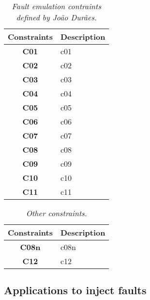 \begin{table}[!ht]
\centering
\begin{tabular}{|c|p{12cm}|}
\hline
\textbf{Constraints}            & \multicolumn{1}{c|}{\textbf{Description}}                                     \\ \hline \hline
\textbf{C01}         & \Acl{c01} \\ \hline
\textbf{C02}         & \Acl{c02} \\ \hline
\textbf{C03}         & \Acl{c03} \\ \hline
\textbf{C04}         & \Acl{c04} \\ \hline
\textbf{C05}         & \Acl{c05} \\ \hline
\textbf{C06}         & \Acl{c06} \\ \hline
\textbf{C07}         & \Acl{c07} \\ \hline
\textbf{C08}         & \Acl{c08} \\ \hline
\textbf{C09}         & \Acl{c09} \\ \hline
\textbf{C10}         & \Acl{c10} \\ \hline
\textbf{C11}         & \Acl{c11} \\ \hline
\end{tabular}
\caption{\small \sl Fault emulation contraints defined by João Durães.\label{tab:faultEmulationConstraintsDuraes}}
\end{table}

\begin{table}[!ht]
\centering
\begin{tabular}{|c|p{12cm}|}
\hline
\textbf{Constraints}            & \multicolumn{1}{c|}{\textbf{Description}}                                     \\ \hline \hline
\textbf{C08n}         & \Acl{c08n} \\ \hline
\textbf{C12}         & \Acl{c12} \\ \hline
\end{tabular}
\caption{\small \sl Other constraints.\label{tab:otherConstraints}}
\end{table}

\clearpage
\subsection{Applications to inject faults}

